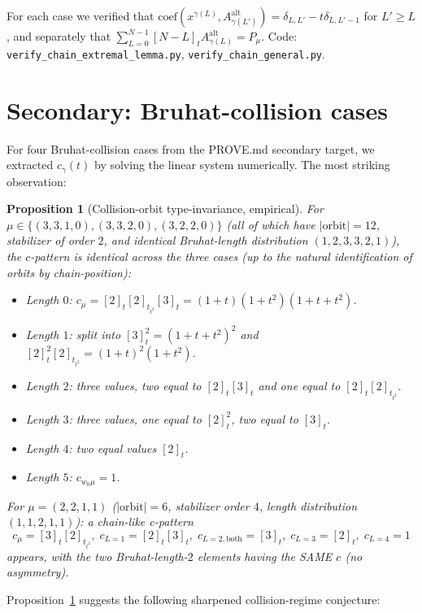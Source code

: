 \documentclass[11pt]{article}
\newtheorem{proposition}[theorem]{Proposition}
\newcommand{\Aalt}{A^{\mathrm{alt}}}
\newcommand{\gauss}[1]{[#1]_t}
\begin{document}
For each case we verified that
$\mathrm{coef}(x^{\gamma(L)}, \Aalt_{\gamma(L')}) = \delta_{L, L'} - t \delta_{L, L'-1}$
for $L' \ge L$, and separately that
$\sum_{L=0}^{N-1} \gauss{N-L} \Aalt_{\gamma(L)} = P_\mu$.
Code: \texttt{verify\_chain\_extremal\_lemma.py}, \texttt{verify\_chain\_general.py}.

\section{Secondary: Bruhat-collision cases}

For four Bruhat-collision cases from the PROVE.md secondary target, we
extracted $c_\gamma(t)$ by solving the linear system numerically.  The most
striking observation:

\begin{proposition}[Collision-orbit type-invariance, empirical]\label{prop:coll-type}
For $\mu \in \{(3,3,1,0), (3,3,2,0), (3,2,2,0)\}$ (all of which have
$|\mathrm{orbit}| = 12$, stabilizer of order $2$, and identical
Bruhat-length distribution $(1, 2, 3, 3, 2, 1)$), the $c$-pattern is
\emph{identical} across the three cases (up to the natural identification
of orbits by chain-position):
\begin{itemize}
\item Length $0$: $c_\mu = \gauss{2} \gauss{2}_{t^2} \gauss{3} = (1+t)(1+t^2)(1+t+t^2)$.
\item Length $1$: split into $\gauss{3}^2 = (1+t+t^2)^2$ and $\gauss{2}^2 \gauss{2}_{t^2} = (1+t)^2 (1+t^2)$.
\item Length $2$: three values, two equal to $\gauss{2}\gauss{3}$ and one equal to $\gauss{2}\gauss{2}_{t^2}$.
\item Length $3$: three values, one equal to $\gauss{2}^2$, two equal to $\gauss{3}$.
\item Length $4$: two equal values $\gauss{2}$.
\item Length $5$: $c_{w_0 \mu} = 1$.
\end{itemize}
For $\mu = (2,2,1,1)$ ($|\mathrm{orbit}| = 6$, stabilizer order $4$, length
distribution $(1,1,2,1,1)$): a chain-like c-pattern
\[
  c_\mu = \gauss{3} \gauss{2}_{t^2}, \; c_{L=1} = \gauss{2}\gauss{3}, \;
  c_{L=2, \text{both}} = \gauss{3}, \; c_{L=3} = \gauss{2}, \; c_{L=4} = 1
\]
appears, with the two Bruhat-length-$2$ elements having the SAME $c$
(no asymmetry).
\end{proposition}

Proposition~\ref{prop:coll-type} suggests the following sharpened
collision-regime conjecture:
\end{document}
